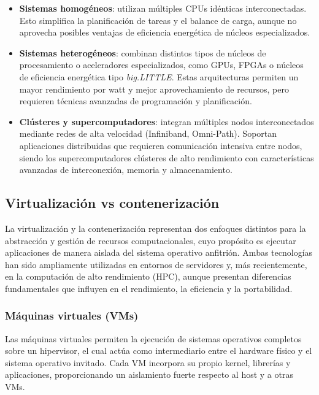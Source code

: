 \begin{itemize}
    \item \textbf{Sistemas homogéneos}: utilizan múltiples CPUs idénticas interconectadas. Esto simplifica la planificación de tareas y el balance de carga, aunque no aprovecha posibles ventajas de eficiencia energética de núcleos especializados.
    \item \textbf{Sistemas heterogéneos}: combinan distintos tipos de núcleos de procesamiento o aceleradores especializados, como GPUs, FPGAs o núcleos de eficiencia energética tipo \textit{big.LITTLE}. Estas arquitecturas permiten un mayor rendimiento por watt y mejor aprovechamiento de recursos, pero requieren técnicas avanzadas de programación y planificación.
    \item \textbf{Clústeres y supercomputadores}: integran múltiples nodos interconectados mediante redes de alta velocidad (Infiniband, Omni-Path). Soportan aplicaciones distribuidas que requieren comunicación intensiva entre nodos, siendo los supercomputadores clústeres de alto rendimiento con características avanzadas de interconexión, memoria y almacenamiento.
\end{itemize}

\subsection{Virtualización vs contenerización}\label{subsec:virtualizacion_contenedores}

La virtualización y la contenerización representan dos enfoques distintos para la abstracción y gestión de recursos computacionales, cuyo propósito es ejecutar aplicaciones de manera aislada del sistema operativo anfitrión. Ambas tecnologías han sido ampliamente utilizadas en entornos de servidores y, más recientemente, en la computación de alto rendimiento (\acs{HPC}), aunque presentan diferencias fundamentales que influyen en el rendimiento, la eficiencia y la portabilidad.

\subsubsection{Máquinas virtuales (VMs)}

Las máquinas virtuales permiten la ejecución de sistemas operativos completos sobre un hipervisor, el cual actúa como intermediario entre el hardware físico y el sistema operativo invitado. Cada VM incorpora su propio kernel, librerías y aplicaciones, proporcionando un aislamiento fuerte respecto al host y a otras VMs.

